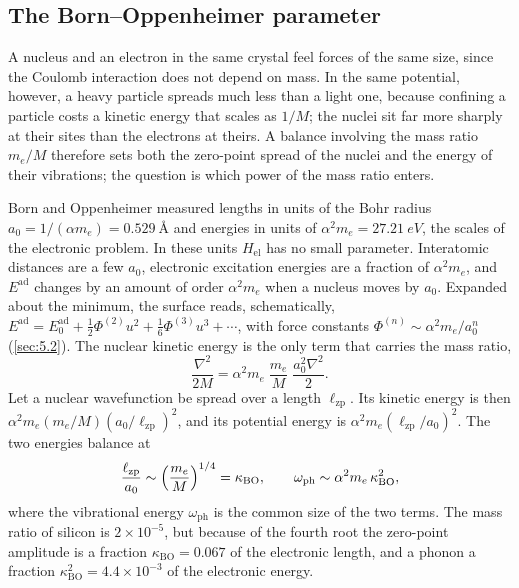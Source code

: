 \subsection{The Born--Oppenheimer parameter}

A nucleus and an electron in the same crystal feel forces of the same size, since the Coulomb interaction does not depend on mass. In the same potential, however, a heavy particle spreads much less than a light one, because confining a particle costs a kinetic energy that scales as $1/M$; the nuclei sit far more sharply at their sites than the electrons at theirs. A balance involving the mass ratio $m_e/M$ therefore sets both the zero-point spread of the nuclei and the energy of their vibrations; the question is which power of the mass ratio enters.

Born and Oppenheimer measured lengths in units of the Bohr radius $a_0 = 1/(\alpha m_e) = \SI{0.529}{\angstrom}$ and energies in units of $\alpha^2m_e = \SI{27.21}{eV}$, the scales of the electronic problem. In these units $H_{\mathrm{el}}$ has no small parameter. Interatomic distances are a few $a_0$, electronic excitation energies are a fraction of $\alpha^2m_e$, and $E^{\mathrm{ad}}$ changes by an amount of order $\alpha^2m_e$ when a nucleus moves by $a_0$. Expanded about the minimum, the surface reads, schematically, $E^{\mathrm{ad}} = E^{\mathrm{ad}}_0 + \tfrac12\Phi^{(2)}u^2 + \tfrac16\Phi^{(3)}u^3 + \cdots$, with force constants $\Phi^{(n)} \sim \alpha^2m_e/a_0^n$ (\cref{sec:5.2}). The nuclear kinetic energy is the only term that carries the mass ratio,
\begin{equation*}
  \frac{\nabla^2}{2M} = \alpha^2m_e\;\frac{m_e}{M}\;\frac{a_0^2\nabla^2}{2} .
\end{equation*}
Let a nuclear wavefunction be spread over a length $\ell_{\mathrm{zp}}$. Its kinetic energy is then $\alpha^2m_e(m_e/M)(a_0/\ell_{\mathrm{zp}})^2$, and its potential energy is $\alpha^2m_e(\ell_{\mathrm{zp}}/a_0)^2$. The two energies balance at
\begin{equation}
  \frac{\ell_{\mathrm{zp}}}{a_0} \sim \Bigl(\frac{m_e}{M}\Bigr)^{1/4} = \kappa_{\mathrm{BO}} , \qquad
  \omega_{\mathrm{ph}} \sim \alpha^2m_e\,\kappa_{\mathrm{BO}}^2 ,
  \label{eq:5.1-scales}
\end{equation}
where the vibrational energy $\omega_{\mathrm{ph}}$ is the common size of the two terms. The mass ratio of silicon is $2\times10^{-5}$, but because of the fourth root the zero-point amplitude is a fraction $\kappa_{\mathrm{BO}} = 0.067$ of the electronic length, and a phonon a fraction $\kappa_{\mathrm{BO}}^2 = 4.4\times10^{-3}$ of the electronic energy.

